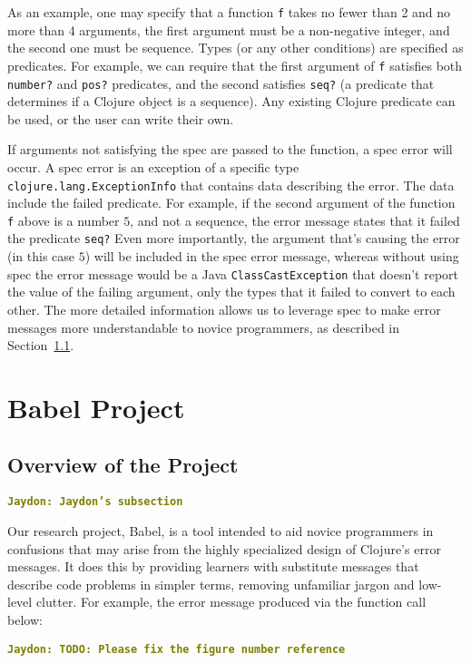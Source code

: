 \documentclass[12pt]{article}
\newcommand{\comment}[1]{{\bf \tt  {#1}}}
\newcommand{\jscomment}[1]{\textcolor{olive}{\comment{Jaydon: {#1}}}}
\begin{document}
As an example, one may specify that a function \texttt{f} takes no fewer than 2 and no more than 4 arguments, the first argument must be a non-negative integer, and the second one must be sequence. 
Types (or any other conditions) are specified as predicates. 
For example, we can require that the first argument of \texttt{f} satisfies both \texttt{number?} and \texttt{pos?} predicates, and the second satisfies \texttt{seq?} (a predicate that determines if a Clojure object is a sequence).
Any existing Clojure predicate can be used, or the user can write their own. 

If arguments not satisfying the spec are passed to the function, a spec error will occur. 
A spec error is an exception of a specific type \texttt{clojure.lang.ExceptionInfo} that contains data describing the error. 
The data include the failed predicate.
For example, if the second argument of the function 
\texttt{f} above is a number $5$, and not a sequence, the error message states that it failed the predicate \texttt{seq?}
Even more importantly, the argument that's causing the error (in this case $5$) will be included in the spec error message, whereas without using spec the error message would be a Java \texttt{ClassCastException} that doesn't report the value of the failing argument, only the types that it failed to convert to each other. 
The more detailed information allows us to leverage spec to make error messages more understandable to novice programmers, as described in Section~\ref{subsec:overview}. 

\section{Babel Project}\label{sec:babel}
\subsection{Overview of the Project}\label{subsec:overview}
\jscomment{Jaydon's subsection}

Our research project, Babel, is a tool intended to aid novice programmers in confusions that may arise from the highly specialized design of Clojure's error messages. It does this by providing learners with substitute messages that describe code problems in simpler terms, removing unfamiliar jargon and low-level clutter. For example, the error message produced via the function call below:

\jscomment{TODO: Please fix the figure number reference}
\end{document}
